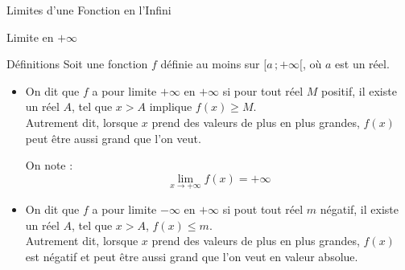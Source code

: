 \documentclass{coursbook}
\begin{document}
    \begin{Gpartie}{Limites d'une Fonction en l'Infini} 
        \begin{Spartie}{Limite en $+\infty$} 
            \begin{SSpartie}{Définitions} 
                Soit une fonction $f$ définie au moins sur $\big[a\,;+\infty\big[$, où $a$ est un réel.

                \begin{itemize}
                    \item   On dit que $f$ a pour limite $+\infty$ en $+\infty$ si pour tout réel $M$ positif, il existe un réel $A$, tel que $x>A$ implique $f(x)\geq M$. \\ Autrement dit, lorsque $x$ prend des valeurs de plus en plus grandes, $f(x)$ peut être aussi grand que l'on veut.
                    
                    On note : \[\boxed{\lim\limits_{x\to +\infty}f(x)=+\infty}\] 
                    \begin{center}
                        \parbox{\linewidth}{}
                    \end{center}
                    \vfill
                    \pagebreak
                    \item   On dit que $f$ a pour limite $-\infty$ en $+\infty$ si pout tout réel $m$ négatif, il existe un réel $A$, tel que $x>A$, $f(x)\leq m$. \\ Autrement dit, lorsque $x$ prend des valeurs de plus en plus grandes, $f(x)$ est négatif et peut être aussi grand que l'on veut en valeur absolue.
                    

\end{itemize}
\end{SSpartie}
\end{Spartie}
\end{Gpartie}
\end{document}
